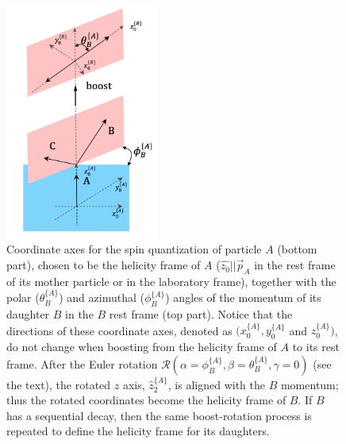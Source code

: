 \begin{figure}[!hbtp]
\centering
\includegraphics[width=0.45\textwidth]{Figures/03_Zcs/05_Likelihood/Cartoon/helicity.png}%
\caption{Coordinate axes for the spin quantization of particle $A$ (bottom part), 
   chosen to be the helicity frame of $A$ ($\hat{z_{0}}||\vec{p}_{A}$ in the rest frame of its mother particle or in the laboratory frame),
   together with the polar ($\theta_{B}^{\{A\}}$) and azimuthal ($\phi_{B}^{\{A\}}$) angles of the momentum of its daughter $B$ in the $B$ rest frame (top part). 
   Notice that the directions of these coordinate axes, 
   denoted as $(x_{0}^{\{A\}}, y_{0}^{\{A\}}$ and $z_{0}^{\{A\}})$, 
   do not change when boosting from the helicity frame of $A$ to its rest frame.
   After the Euler rotation $\mathscr{R}(\alpha=\phi_{B}^{\{A\}},\beta=\theta_{B}^{\{A\}},\gamma=0)$ (see the text), 
   the rotated $z$ axis, 
   $\hat{z}_{2}^{\{A\}}$, 
   is aligned with the $B$ momentum; 
   thus the rotated coordinates become the helicity frame of $B$. 
   If $B$ has a sequential decay, 
   then the same boost-rotation process is repeated to define the helicity frame for its daughters.}
\label{fig:helicity}
\end{figure}


